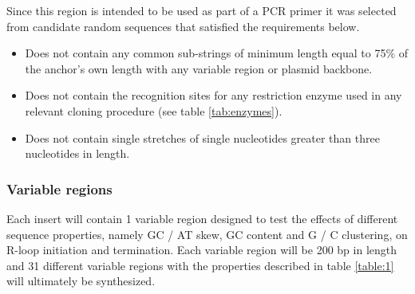 \documentclass[11pt]{article}
\begin{document}
Since this region is intended to be used as part of a PCR primer it was selected from candidate random sequences that satisfied the requirements below.

\begin{itemize}
	\item Does not contain any common sub-strings of minimum length equal to 75\% of the anchor's own length with any variable region or plasmid backbone.
	\item Does not contain the recognition sites for any restriction enzyme used in any relevant cloning procedure (see table \ref{tab:enzymes}).
	\item Does not contain single stretches of single nucleotides greater than three nucleotides in length.
\end{itemize}


\subsubsection{Variable regions}

Each insert will contain 1 variable region designed to test the effects of different sequence properties, namely GC / AT skew, GC content and G / C clustering, on R-loop initiation and termination. Each variable region will be 200 bp in length and 31 different variable regions with the properties described in table \ref{table:1} will ultimately be synthesized. 
\end{document}

